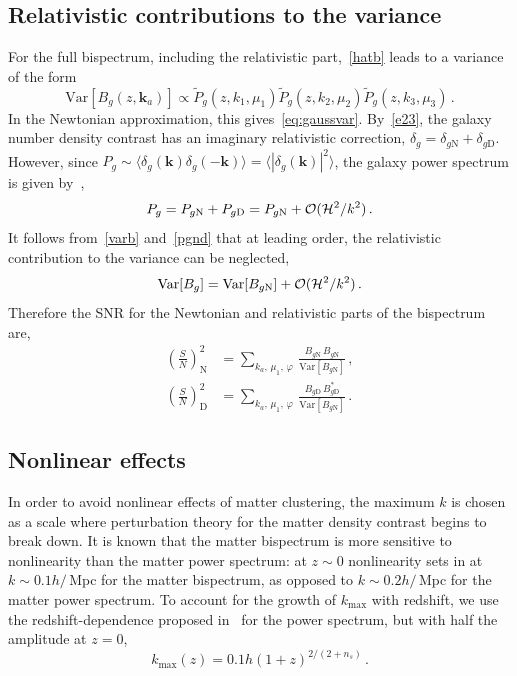 \subsection{Relativistic contributions to the variance}
%
%
For the full bispectrum, including the relativistic part,~\eqref{hatb} leads to a variance of the form 
\begin{equation} \label{varb}
\mathrm{Var} [{B_{g}}(z,\bm{k}_a)] \propto \tilde{P}_{g}(z,k_{1},\mu_{1}) \tilde{P}_{g}(z,k_{2},\mu_{2})\tilde{P}_{g}(z,k_{3},\mu_{3}) \,.
\end{equation}
In the Newtonian approximation, this gives~\eqref{eq:gaussvar}. By~\eqref{e23}, the galaxy number density contrast has an imaginary relativistic correction, $\delta_g=\delta_{g\mathrm{N}} + \delta_{g\mathrm{D}}$. However, since $P_g \sim\langle \delta_g(\bm{k}) \delta_g(\bm{-k})\rangle =\langle |\delta_g(\bm{k})|^2\rangle$, the galaxy power spectrum is given by~\cite{McDonald:2009dh,Abramo:2017xnp,Clarkson:2018dwn},
\begin{equation} \label{pgnd}
P_g = P_{g\mathrm{N}} + P_{g \mathrm{D}} =  P_{g \mathrm{N}} + \mathcal{O}(\mathcal{H}^2/k^2)\,.
\end{equation}
It follows from~\eqref{varb} and~\eqref{pgnd} that at leading order, the relativistic contribution to the variance can be neglected,
\begin{equation}
\mathrm{Var} [{B_{g}}] = \mathrm{Var} [B_{g\mathrm{N}}] + \mathcal{O}(\mathcal{H}^2/k^2)\,.
\end{equation}
Therefore the SNR for the Newtonian and relativistic parts of the bispectrum are,
\begin{align}
\left(\frac{S}{N}\right)^2_\mathrm{N} &= 
\sum_{k_a,\,\mu_{1},\,\varphi}\, \frac{B_{g \mathrm{N}}\,B_{g\mathrm{N}}}{\mathrm{Var} [B_{g \mathrm{N}}] }\,,\label{e3a}\\
\left(\frac{S}{N}\right)^{2}_\mathrm{D} &= 
\sum_{k_a,\,\mu_{1},\,\varphi} \, \frac{ B_{g \mathrm{D}} \, B^*_{g \mathrm{D}}  }{ \mathrm{Var} [B_{g{\mathrm{N}}}]}\,.\label{e3b}  
\end{align}
%
%
\subsection{Nonlinear effects}
%
%
In order to avoid nonlinear effects of matter clustering, the maximum $k$ is chosen as a scale where perturbation theory for the matter density contrast begins to break down. It is known that the matter bispectrum is more sensitive to nonlinearity than the matter power spectrum: at $z\sim 0$ nonlinearity sets in at $k\sim 0.1h/\,$Mpc for the matter bispectrum, as opposed to $k\sim 0.2h/\,$Mpc for the matter power spectrum. To account for the growth of $k_{\mathrm{max}}$ with redshift, we use the redshift-dependence proposed in~\cite{Smith:2002dz} for the power spectrum, but with half the amplitude at $z=0$,
\begin{equation}\label{kmax}
k_\mathrm{max}(z) = {0.1h}\left(1+z\right)^{2/(2+n_{s})}\,.
\end{equation}

